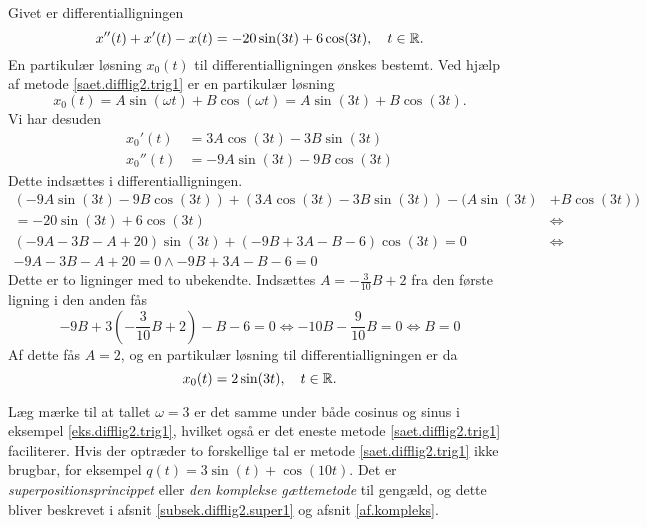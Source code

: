 \begin{example}[Trigonometrisk] \label{eks.difflig2.trig1}
Givet er differentialligningen
\begin{equation}
x''(t) + x'(t) - x(t) = -20\sin(3t) + 6\cos(3t), \quad t \in \mathbb{R}.
\end{equation}
En partikulær løsning $ x_0(t) $ til differentialligningen ønskes bestemt. Ved hjælp af metode \ref{saet.difflig2.trig1} er en partikulær løsning
\begin{equation}
x_0(t) = A\sin(\omega t) + B\cos(\omega t) = A\sin(3t) + B\cos(3t).
\end{equation}
Vi har desuden
\begin{equation}
\begin{aligned}
x_0'(t) &= 3A\cos(3t) - 3B\sin(3t) \\
x_0''(t) &= -9A\sin(3t) - 9B\cos(3t)
\end{aligned}
\end{equation}
Dette indsættes i differentialligningen.
\begin{equation}
\begin{aligned}
(-9A\sin(3t) - 9B\cos(3t)) + (3A\cos(3t) - 3B\sin(3t)) - (A\sin(3t) &+ B\cos(3t)) \\
= -20\sin(3t) + 6\cos(3t) &\Leftrightarrow \\
(-9A-3B-A+20)\sin(3t) + (-9B+3A-B-6)\cos(3t) = 0  &\Leftrightarrow \\
-9A-3B-A+20 = 0 \wedge -9B+3A-B-6 = 0 &
\end{aligned}
\end{equation}
Dette er to ligninger med to ubekendte. Indsættes $ A = -\frac{3}{10}B + 2 $ fra den første ligning i den anden fås
\begin{equation}
-9B+3\left(-\frac{3}{10}B + 2\right)-B-6 = 0 \Leftrightarrow -10B - \frac{9}{10}B = 0 \Leftrightarrow B = 0
\end{equation}
Af dette fås $ A = 2 $, og en partikulær løsning til differentialligningen er da
\begin{equation}
x_0(t) = 2\sin(3t), \quad t \in \mathbb{R}.
\end{equation}
\end{example}

\begin{obs}
Læg mærke til at tallet $ \omega = 3 $ er det samme under både cosinus og sinus i eksempel \ref{eks.difflig2.trig1}, hvilket også er det eneste metode \ref{saet.difflig2.trig1} faciliterer. Hvis der optræder to forskellige tal er metode \ref{saet.difflig2.trig1} ikke brugbar, for eksempel $ q(t) = 3\sin(t) + \cos(10t) $. Det er \textit{superpositionsprincippet} eller \textit{den komplekse gættemetode} til gengæld, og dette bliver beskrevet i afsnit \ref{subsek.difflig2.super1} og afsnit \ref{af.kompleks}.
\end{obs}

